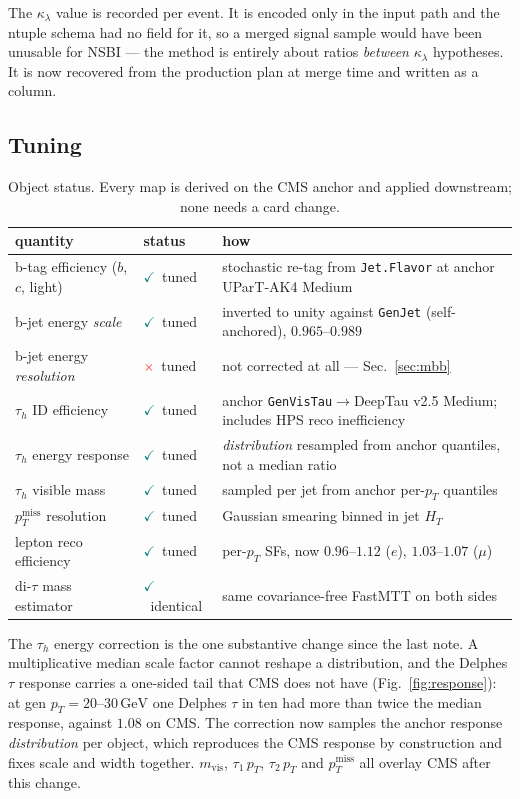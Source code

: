 \documentclass[11pt,a4paper]{article}
\newcommand{\tauh}{\tau_{h}}
\newcommand{\mvis}{m_{\mathrm{vis}}}
\newcommand{\kl}{\kappa_{\lambda}}
\newcommand{\ptmiss}{p_{T}^{\mathrm{miss}}}
\newcommand{\yes}{\textcolor{teal}{$\checkmark$}}
\newcommand{\no}{\textcolor{red}{$\times$}}
\begin{document}
The $\kl$ value is recorded per event. It is encoded only in the input path and the
ntuple schema had no field for it, so a merged signal sample would have been unusable for
NSBI --- the method is entirely about ratios \emph{between} $\kl$ hypotheses. It is now
recovered from the production plan at merge time and written as a column.

\subsection{Tuning}

\begin{table}[htbp]
\centering\small
\begin{tabular}{llp{6.3cm}}
\toprule
quantity & status & how \\
\midrule
b-tag efficiency ($b$, $c$, light) & \yes\ tuned & stochastic re-tag from \texttt{Jet.Flavor} at anchor UParT-AK4 Medium \\
b-jet energy \emph{scale}          & \yes\ tuned & inverted to unity against \texttt{GenJet} (self-anchored), $0.965$--$0.989$ \\
b-jet energy \emph{resolution}     & \no\ tuned  & not corrected at all --- Sec.~\ref{sec:mbb} \\
$\tauh$ ID efficiency              & \yes\ tuned & anchor \texttt{GenVisTau}$\rightarrow$DeepTau v2.5 Medium; includes HPS reco inefficiency \\
$\tauh$ energy response            & \yes\ tuned & \emph{distribution} resampled from anchor quantiles, not a median ratio \\
$\tauh$ visible mass               & \yes\ tuned & sampled per jet from anchor per-$p_{T}$ quantiles \\
$\ptmiss$ resolution               & \yes\ tuned & Gaussian smearing binned in jet $H_{T}$ \\
lepton reco efficiency             & \yes\ tuned & per-$p_{T}$ SFs, now $0.96$--$1.12$ ($e$), $1.03$--$1.07$ ($\mu$) \\
di-$\tau$ mass estimator           & \yes\ identical & same covariance-free FastMTT on both sides \\
\bottomrule
\end{tabular}
\caption{Object status. Every map is derived on the CMS anchor and applied downstream;
none needs a card change.\label{tab:tuning}}
\end{table}

The $\tauh$ energy correction is the one substantive change since the last note. A
multiplicative median scale factor cannot reshape a distribution, and the Delphes $\tau$
response carries a one-sided tail that CMS does not have (Fig.~\ref{fig:response}): at gen
$p_{T}=20$--$30\,\si{\GeV}$ one Delphes $\tau$ in ten had more than twice the median
response, against $1.08$ on CMS. The correction now samples the anchor response
\emph{distribution} per object, which reproduces the CMS response by construction and fixes
scale and width together. $\mvis$, $\tau_{1}\,p_{T}$, $\tau_{2}\,p_{T}$ and $\ptmiss$ all
overlay CMS after this change.
\end{document}
